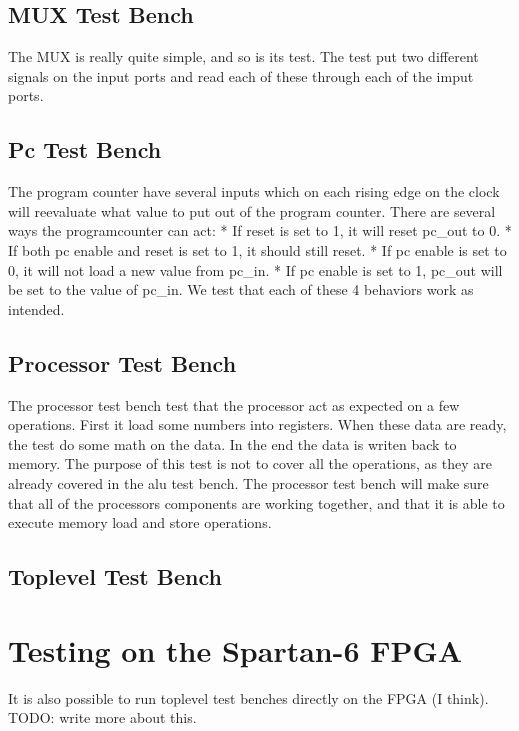 \subsection{MUX Test Bench}

The MUX is really quite simple, and so is its test.
The test put two different signals on the input ports and read each of these through each of the imput ports.

\subsection{Pc Test Bench}

The program counter have several inputs which on each rising edge on the clock will reevaluate what value to put out of the program counter.
There are several ways the programcounter can act:
* If reset is set to 1, it will reset pc\_out to 0.
* If both pc enable and reset is set to 1, it should still reset.
* If pc enable is set to 0, it will not load a new value from pc\_in.
* If pc enable is set to 1, pc\_out will be set to the value of pc\_in.
We test that each of these 4 behaviors work as intended.


\subsection{Processor Test Bench}

The processor test bench test that the processor act as expected on a few operations.
First it load some numbers into registers.
When these data are ready, the test do some math on the data.
In the end the data is writen back to memory.
The purpose of this test is not to cover all the operations, as they are already covered in the alu test bench.
The processor test bench will make sure that all of the processors components are working together, and that it is able to execute memory load and store operations.

\subsection{Toplevel Test Bench}



\section{Testing on the Spartan-6 FPGA}

It is also possible to run toplevel test benches directly on the FPGA (I think).
TODO: write more about this.
